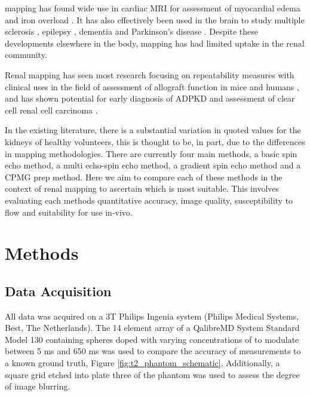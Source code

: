\ttwo mapping has found wide use in cardiac \ac{MRI} for assessment of myocardial edema \cite{gouya_rapidly_2008, giri_t2_2009, nasenstein_cardiac_2014} and iron overload \cite{guo_myocardial_2009, krittayaphong_detection_2017}. It has also effectively been used in the brain to study multiple sclerosis \cite{neema_t1-_2007}, epilepsy \cite{rugg-gunn_whole-brain_2005}, dementia \cite{knight_quantitative_2016} and Parkinson’s disease \cite{vymazal_t1_1999}. Despite these developments elsewhere in the body, \ttwo mapping has had limited uptake in the renal community.

Renal \ttwo mapping has seen most research focusing on repeatability measures \cite{de_bazelaire_mr_2004, zhang_reproducibility_2011, li_measuring_2015, de_boer_multiparametric_2020} with clinical uses in the field of assessment of allograft function in mice \cite{hueper_kidney_2016} and humans \cite{mathys_t2_2011, adams_multiparametric_2020}, and has shown potential for early diagnosis of \ac{ADPKD} \cite{franke_magnetic_2017} and assessment of clear cell renal cell carcinoma \cite{adams_use_2019}.

In the existing literature, there is a substantial variation in quoted \ttwo values for the kidneys of healthy volunteers, this is thought to be, in part, due to the differences in \ttwo mapping methodologies. There are currently four main methods, a basic spin echo method, a multi echo-spin echo method, a gradient spin echo method and a \ac{CPMG} \ttwo prep method. Here we aim to compare each of these methods in the context of renal \ttwo mapping to ascertain which is most suitable. This involves evaluating each methods quantitative accuracy, image quality, susceptibility to flow and suitability for use in-vivo.

\section{Methods}
\label{sec:t2_methods}

\subsection{Data Acquisition}
\label{subsec:t2_acq_schemes}

All data was acquired on a 3T Philips Ingenia system (Philips Medical Systems, Best, The Netherlands). The 14 element \ttwo array of a QalibreMD System Standard Model 130 containing spheres doped with varying concentrations of  to modulate \ttwo between 5 ms and 650 ms was used to compare the accuracy of \ttwo measurements to a known ground truth, Figure \ref{fig:t2_phantom_schematic}. Additionally, a square grid etched into plate three of the phantom was used to assess the degree of image blurring. 


